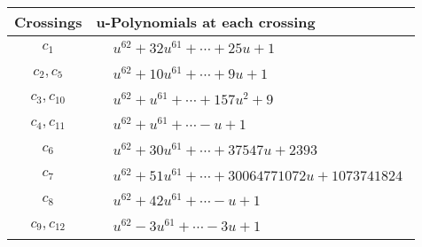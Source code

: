 \documentclass[1p]{elsarticle_modified}
\theoremstyle{definition}
\begin{document}
\begin{tabular}{m{50pt}|m{274pt}}
Crossings & \hspace{64pt}u-Polynomials at each crossing \\
\hline $$\begin{aligned}c_{1}\end{aligned}$$&$\begin{aligned}
&u^{62}+32 u^{61}+\cdots+25 u+1
\end{aligned}$\\
\hline $$\begin{aligned}c_{2},c_{5}\end{aligned}$$&$\begin{aligned}
&u^{62}+10 u^{61}+\cdots+9 u+1
\end{aligned}$\\
\hline $$\begin{aligned}c_{3},c_{10}\end{aligned}$$&$\begin{aligned}
&u^{62}+u^{61}+\cdots+157 u^2+9
\end{aligned}$\\
\hline $$\begin{aligned}c_{4},c_{11}\end{aligned}$$&$\begin{aligned}
&u^{62}+u^{61}+\cdots- u+1
\end{aligned}$\\
\hline $$\begin{aligned}c_{6}\end{aligned}$$&$\begin{aligned}
&u^{62}+30 u^{61}+\cdots+37547 u+2393
\end{aligned}$\\
\hline $$\begin{aligned}c_{7}\end{aligned}$$&$\begin{aligned}
&u^{62}+51 u^{61}+\cdots+30064771072 u+1073741824
\end{aligned}$\\
\hline $$\begin{aligned}c_{8}\end{aligned}$$&$\begin{aligned}
&u^{62}+42 u^{61}+\cdots- u+1
\end{aligned}$\\
\hline $$\begin{aligned}c_{9},c_{12}\end{aligned}$$&$\begin{aligned}
&u^{62}-3 u^{61}+\cdots-3 u+1
\end{aligned}$\\
\hline
\end{tabular}\\~\\
\end{document}

